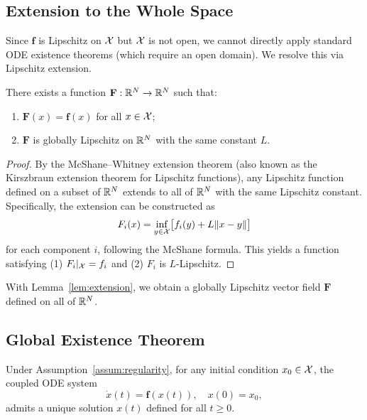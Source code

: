 \subsection{Extension to the Whole Space}

Since $\mathbf{f}$ is Lipschitz on $\mathcal{X}$ but $\mathcal{X}$ is not open, we cannot
directly apply standard ODE existence theorems (which require an open
domain). We resolve this via Lipschitz extension.

\begin{lemma}
\label{lem:extension}
There exists a function $\mathbf{F}: \mathbb{R}^N \to \mathbb{R}^N$ such that:
\begin{enumerate}
\item $\mathbf{F}(x) = \mathbf{f}(x)$ for all $x \in \mathcal{X}$;
\item $\mathbf{F}$ is globally Lipschitz on $\mathbb{R}^N$ with the same constant $L$.
\end{enumerate}
\end{lemma}

\begin{proof}
By the McShane--Whitney extension theorem \cite{mcshane1934extension}
(also known as the Kirszbraun extension theorem for Lipschitz
functions), any Lipschitz function defined on a subset of $\mathbb{R}^N$ extends
to all of $\mathbb{R}^N$ with the same Lipschitz constant. Specifically, the
extension can be constructed as
\[
F_i(x) = \inf_{y \in \mathcal{X}} \bigl[ f_i(y) + L \|x - y\| \bigr]
\]
for each component $i$, following the McShane formula. This yields a
function satisfying (1) $F_i|_{\mathcal{X}} = f_i$ and (2) $F_i$ is $L$-Lipschitz.
\end{proof}

With Lemma~\ref{lem:extension}, we obtain a globally Lipschitz vector
field $\mathbf{F}$ defined on all of $\mathbb{R}^N$.

\subsection{Global Existence Theorem}

\begin{theorem}
\label{thm:global-existence}
Under Assumption~\ref{assum:regularity}, for any initial condition
$x_0 \in \mathcal{X}$, the coupled ODE system
\[
\dot{x}(t) = \mathbf{f}(x(t)), \quad x(0) = x_0,
\]
admits a unique solution $x(t)$ defined for all $t \geq 0$.
\end{theorem}

